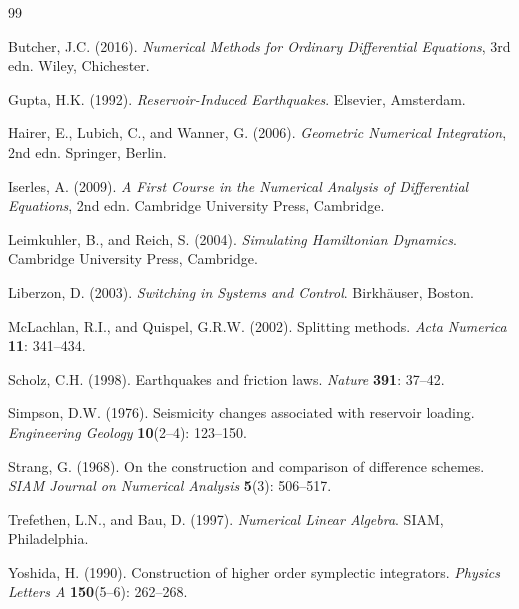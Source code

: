 \documentclass[12pt, a4paper]{article}
\theoremstyle{plain}
\theoremstyle{definition}
\theoremstyle{remark}
\begin{document}
\begin{thebibliography}{99}

Butcher, J.C. (2016). \textit{Numerical Methods for Ordinary Differential
Equations}, 3rd edn. Wiley, Chichester.

Gupta, H.K. (1992). \textit{Reservoir-Induced Earthquakes}. Elsevier,
Amsterdam.

Hairer, E., Lubich, C., and Wanner, G. (2006). \textit{Geometric Numerical
Integration}, 2nd edn. Springer, Berlin.

Iserles, A. (2009). \textit{A First Course in the Numerical Analysis of
Differential Equations}, 2nd edn. Cambridge University Press, Cambridge.

Leimkuhler, B., and Reich, S. (2004). \textit{Simulating Hamiltonian
Dynamics}. Cambridge University Press, Cambridge.

Liberzon, D. (2003). \textit{Switching in Systems and Control}.
Birkh\"auser, Boston.

McLachlan, R.I., and Quispel, G.R.W. (2002). Splitting methods.
\textit{Acta Numerica} \textbf{11}: 341--434.

Scholz, C.H. (1998). Earthquakes and friction laws. \textit{Nature}
\textbf{391}: 37--42.

Simpson, D.W. (1976). Seismicity changes associated with reservoir loading.
\textit{Engineering Geology} \textbf{10}(2--4): 123--150.

Strang, G. (1968). On the construction and comparison of difference schemes.
\textit{SIAM Journal on Numerical Analysis} \textbf{5}(3): 506--517.

Trefethen, L.N., and Bau, D. (1997). \textit{Numerical Linear Algebra}.
SIAM, Philadelphia.

Yoshida, H. (1990). Construction of higher order symplectic integrators.
\textit{Physics Letters A} \textbf{150}(5--6): 262--268.

\end{thebibliography}
\end{document}
